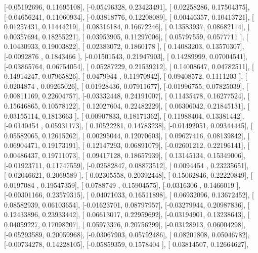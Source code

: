 \documentclass{article}
\begin{document}
       [-0.05192696,  0.11695108],
       [-0.05496328,  0.23423491],
       [ 0.02258286,  0.17504375],
       [-0.04656241,  0.11060934],
       [-0.03818776,  0.12208089],
       [ 0.00446357,  0.10413721],
       [ 0.01257431,  0.11444219],
       [ 0.08316184,  0.16672246],
       [ 0.13583937,  0.08682114],
       [ 0.00357694,  0.18255221],
       [ 0.03953905,  0.11297006],
       [ 0.05797559,  0.0577711 ],
       [ 0.10430933,  0.19003822],
       [ 0.02383072,  0.1860178 ],
       [ 0.14083203,  0.13570307],
       [-0.0092876 ,  0.1843466 ],
       [-0.01501543,  0.21947903],
       [ 0.14289999,  0.07004541],
       [-0.03865764,  0.06754054],
       [ 0.05287229,  0.21539212],
       [ 0.14008647,  0.04782511],
       [ 0.14914247,  0.07965826],
       [ 0.0479944 ,  0.11970942],
       [ 0.09408572,  0.1111203 ],
       [ 0.0204874 ,  0.09265026],
       [ 0.01928436,  0.07911677],
       [-0.01996755,  0.07825039],
       [ 0.00811169,  0.22604757],
       [-0.03332448,  0.24191007],
       [ 0.11435478,  0.16277524],
       [ 0.15646865,  0.10578122],
       [ 0.12027604,  0.22482229],
       [ 0.06306042,  0.21845131],
       [ 0.03155114,  0.1813663 ],
       [ 0.00907833,  0.18171362],
       [ 0.11988404,  0.13381442],
       [-0.0140454 ,  0.05931173],
       [ 0.10522281,  0.14783238],
       [-0.01492051,  0.09344445],
       [ 0.05582065,  0.12615262],
       [ 0.00295044,  0.12070603],
       [ 0.09627416,  0.08139842],
       [ 0.06904471,  0.19173191],
       [ 0.12147293,  0.06891079],
       [-0.02601212,  0.22196141],
       [ 0.00486437,  0.19711073],
       [ 0.09417128,  0.18657939],
       [ 0.13145134,  0.15349006],
       [-0.01923711,  0.11747559],
       [-0.02582847,  0.08873512],
       [ 0.0094454 ,  0.23235651],
       [-0.02046621,  0.2069589 ],
       [ 0.02305558,  0.20392448],
       [ 0.15062846,  0.22220849],
       [ 0.0197084 ,  0.19547359],
       [ 0.0788749 ,  0.15904575],
       [-0.0316306 ,  0.1466019 ],
       [-0.00301166,  0.23579315],
       [ 0.04071033,  0.16511898],
       [ 0.06932096,  0.13672452],
       [ 0.08582939,  0.06103654],
       [-0.01623701,  0.08797957],
       [-0.03279944,  0.20987836],
       [ 0.12433896,  0.23933442],
       [ 0.06613017,  0.22959692],
       [-0.03194901,  0.13238643],
       [ 0.04059227,  0.17098207],
       [ 0.05973376,  0.20756299],
       [-0.03128913,  0.06004298],
       [-0.05293589,  0.20059968],
       [-0.03067903,  0.05792486],
       [ 0.08201808,  0.05046782],
       [-0.00734278,  0.14228105],
       [-0.05859359,  0.1578404 ],
       [ 0.03814507,  0.12664627],
\end{document}
